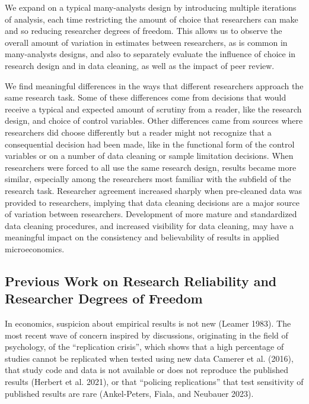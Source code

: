 \documentclass[
  letterpaper,
  DIV=11,
  numbers=noendperiod]{scrartcl}
\begin{document}
We expand on a typical many-analysts design by introducing multiple
iterations of analysis, each time restricting the amount of choice that
researchers can make and so reducing researcher degrees of freedom. This
allows us to observe the overall amount of variation in estimates
between researchers, as is common in many-analysts designs, and also to
separately evaluate the influence of choice in research design and in
data cleaning, as well as the impact of peer review.

We find meaningful differences in the ways that different researchers
approach the same research task. Some of these differences come from
decisions that would receive a typical and expected amount of scrutiny
from a reader, like the research design, and choice of control
variables. Other differences came from sources where researchers did
choose differently but a reader might not recognize that a consequential
decision had been made, like in the functional form of the control
variables or on a number of data cleaning or sample limitation
decisions. When researchers were forced to all use the same research
design, results became more similar, especially among the researchers
most familiar with the subfield of the research task. Researcher
agreement increased sharply when pre-cleaned data was provided to
researchers, implying that data cleaning decisions are a major source of
variation between researchers. Development of more mature and
standardized data cleaning procedures, and increased visibility for data
cleaning, may have a meaningful impact on the consistency and
believability of results in applied microeconomics.

\hypertarget{previous-work-on-research-reliability-and-researcher-degrees-of-freedom}{%
\subsection{Previous Work on Research Reliability and Researcher Degrees
of
Freedom}\label{previous-work-on-research-reliability-and-researcher-degrees-of-freedom}}

In economics, suspicion about empirical results is not new (Leamer
1983). The most recent wave of concern inspired by discussions,
originating in the field of psychology, of the ``replication crisis'',
which shows that a high percentage of studies cannot be replicated when
tested using new data Camerer et al. (2016), that study code and data is
not available or does not reproduce the published results (Herbert et
al. 2021), or that ``policing replications'' that test sensitivity of
published results are rare (Ankel-Peters, Fiala, and Neubauer 2023).
\end{document}
